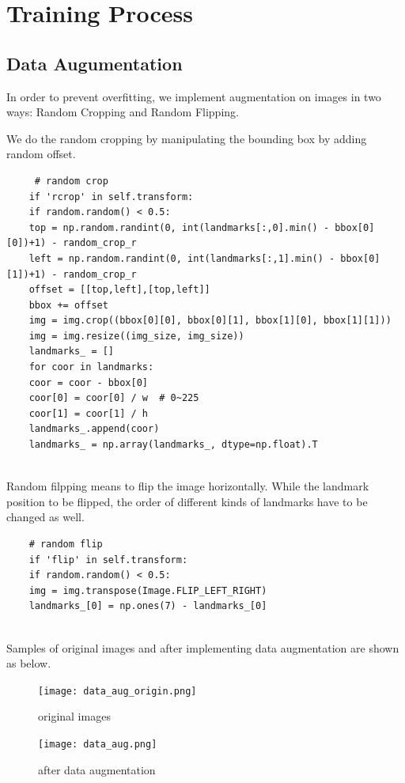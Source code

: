 \documentclass{article}
\begin{document}
\section{Training Process}
\subsection{Data Augumentation}
In order to prevent overfitting, we implement augmentation on images in two ways: Random Cropping and Random Flipping.

We do the random cropping by manipulating the bounding box by adding random offset.

\begin{commandline}
	\begin{verbatim}
	 # random crop
	if 'rcrop' in self.transform:
	if random.random() < 0.5:
	top = np.random.randint(0, int(landmarks[:,0].min() - bbox[0][0])+1) - random_crop_r
	left = np.random.randint(0, int(landmarks[:,1].min() - bbox[0][1])+1) - random_crop_r
	offset = [[top,left],[top,left]]
	bbox += offset
	img = img.crop((bbox[0][0], bbox[0][1], bbox[1][0], bbox[1][1]))
	img = img.resize((img_size, img_size))
	landmarks_ = []
	for coor in landmarks:
	coor = coor - bbox[0]
	coor[0] = coor[0] / w  # 0~225
	coor[1] = coor[1] / h 
	landmarks_.append(coor)
	landmarks_ = np.array(landmarks_, dtype=np.float).T
	

	\end{verbatim}
\end{commandline}


Random filpping means to flip the image horizontally. While the landmark position to be flipped, the order of different kinds of landmarks have to be changed as well.

\begin{commandline}
	\begin{verbatim}
	# random flip
	if 'flip' in self.transform:
	if random.random() < 0.5:
	img = img.transpose(Image.FLIP_LEFT_RIGHT)
	landmarks_[0] = np.ones(7) - landmarks_[0]
	
	\end{verbatim}
\end{commandline}

Samples of original images and after implementing data augmentation are shown as below.

\begin{figure}[h]
	\begin{minipage}[t]{0.5\linewidth}
		\centering
		\texttt{[image: data\_aug\_origin.png]}
		\caption{original images}
		\label{fig:side:a}
	\end{minipage}%
	\begin{minipage}[t]{0.5\linewidth}
		\centering
		\texttt{[image: data\_aug.png]}
		\caption{after data augmentation}
		\label{fig:side:b}
	\end{minipage}
\end{figure}
\end{document}
